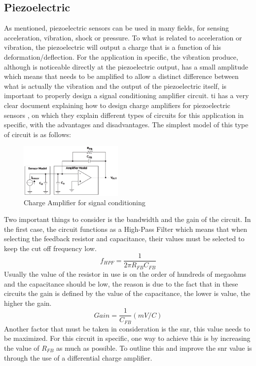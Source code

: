 \subsection{Piezoelectric}
As mentioned, piezoelectric sensors can be used in many fields, for sensing acceleration, vibration, shock or pressure. To what is related to acceleration or vibration, the piezoelectric will output a charge that is a function of his deformation/deflection. For the application in specific, the vibration produce, although is noticeable directly at the piezoelectric output, has a small amplitude which means that needs to be amplified to allow a distinct difference between what is actually the vibration and the output of the piezoelectric itself, is important to properly design a signal conditioning amplifier circuit. \acrlong{ti} has a very clear document explaining how to design charge amplifiers for piezoelectric sensors \cite{bartolomeSignalConditioningPiezoelectric2010}, on which they explain different types of circuits for this application in specific, with the advantages and disadvantages. The simplest model of this type of circuit is as follows: 
\begin{figure}[]
    \centering
    \includegraphics[width=0.45\textwidth]{Chapters/4CHP/Figures/singleenddedchargeamp.pdf}
    \caption{Charge Amplifier for signal conditioning}
    \label{fig:ChargeAmpSimp}
\end{figure}
Two important things to consider is the bandwidth and the gain of the circuit. In the first case, the circuit functions as a High-Pass Filter which means that when selecting the feedback resistor and capacitance, their values must be selected to keep the cut off frequency low.
\begin{equation}\label{eq:fhpf}
    f_{HPF} = \frac{1}{2\pi R_{FB}C_{FB}}
\end{equation}
Usually the value of the resistor in use is on the order of hundreds of megaohms and the capacitance should be low, the reason is due to the fact that in these circuits the gain is defined by the value of the capacitance, the lower is value, the higher the gain.
\begin{equation}
    Gain = \frac{1}{C_{FB}} (mV/C)
\end{equation}
Another factor that must be taken in consideration is the \acrshort{snr}, this value needs to be maximized. For this circuit in specific, one way to achieve this is by increasing the value of $R_{FB}$ as much as possible. To outline this and improve the \acrshort{snr} value is through the use of a differential charge amplifier.


